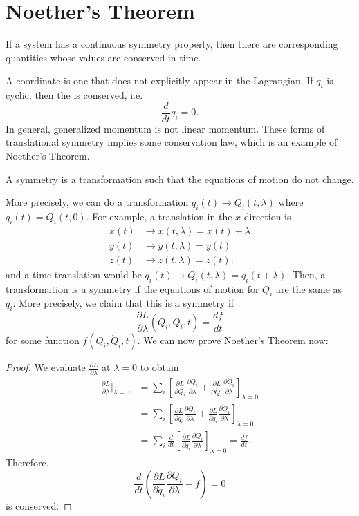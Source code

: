 \documentclass{article}
\numberwithin{equation}{section}
\begin{document}
\section{Noether's Theorem}
\begin{theorem}
    If a system has a continuous symmetry property, then there are corresponding quantities whose values are conserved in time.
\end{theorem}
A  coordinate is one that does not explicitly appear in the Lagrangian. If $q_i$ is cyclic, then the  is conserved, i.e.
\begin{equation}
    \frac{d}{dt}q_i = 0.
\end{equation}
In general, generalized momentum is not linear momentum. These forms of translational symmetry implies some conservation law, which is an example of Noether's Theorem.
\begin{definition}
    A symmetry is a transformation such that the equations of motion do not change.
\end{definition}
More precisely, we can do a transformation $q_i(t) \rightarrow Q_i(t,\lambda)$ where $q_i(t) = Q_i(t,0).$ For example, a translation in the $x$ direction is
\begin{align*}
    x(t) &\to x(t,\lambda) = x(t) + \lambda \\ 
    y(t) &\to y(t,\lambda) = y(t) \\ 
    z(t) &\to z(t,\lambda) = z(t).
\end{align*}
and a time translation would be $q_i(t) \to Q_i(t,\lambda)=q_i(t+\lambda)$. Then, a transformation is a symmetry if the equations of motion for $Q_i$ are the same as $q_i.$ More precisely, we claim that this is a symmetry if 
\begin{equation}
    \frac{\partial L}{\partial \lambda}(Q_i,\dot{Q}_i,t) = \frac{df}{dt}
\end{equation}
for some function $f(Q_i,\dot{Q}_i,t).$ We can now prove Noether's Theorem now:
\begin{proof}
    We evaluate $\frac{\partial L}{\partial \lambda}$ at $\lambda=0$ to obtain
    \begin{align*}
        \frac{\partial L}{\partial \lambda}\big|_{\lambda=0} &= \sum_i \left[\frac{\partial L}{\partial Q_i}\frac{\partial Q_i}{\partial \lambda} + \frac{\partial L}{\partial \dot{Q}_i}\frac{\partial \dot{Q}_i}{\partial \lambda}\right]_{\lambda = 0} \\ 
        &= \sum_i \left[\frac{\partial L}{\partial q_i}\frac{\partial Q_i}{\partial \lambda} + \frac{\partial L}{\partial \dot{q}_i}\frac{\partial \dot{Q}_i}{\partial \lambda}\right]_{\lambda = 0} \\ 
        &= \sum_i \frac{d}{dt}\left[\frac{\partial L}{\partial \dot{q}_i}\frac{\partial Q_i}{\partial \lambda}\right]_{\lambda=0} = \frac{df}{dt}.
    \end{align*}
    Therefore,
    \begin{equation}
        \frac{d}{dt}\left(\frac{\partial L}{\partial \dot{q}_i}\frac{\partial Q_i}{\partial \lambda} - f\right) = 0
    \end{equation}
    is conserved.
\end{proof}
\end{document}
